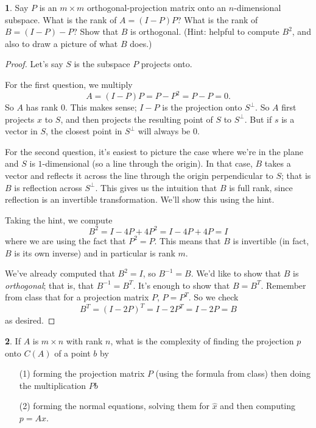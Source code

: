 \documentclass{article}
\theoremstyle{definition}
\newtheorem{prob}{}
\begin{document}
\begin{prob}
	Say $P$ is an $m \times m$ orthogonal-projection matrix onto an $n$-dimensional subspace. What is the rank of $A=(I-P)P$? What is the rank of $B=(I-P)-P$? Show that $B$ is orthogonal. (Hint: helpful to compute $B^2$, and also to draw a picture of what $B$ does.)
\end{prob}
\begin{proof}
	Let's say $S$ is the subspace $P$ projects onto.
	
	For the first question, we multiply 
	\[A=(I-P)P=P-P^2=P-P=0.\]
So $A$ has rank 0. This makes sense; $I-P$ is the projection onto $S^\perp$. So $A$ first projects $x$ to $S$, and then projects the resulting point of $S$ to $S^\perp$. But if $s$ is a vector in $S$, the closest point in $S^\perp$ will always be 0.
	
	For the second question, it's easiest to picture the case where we're in the plane and $S$ is $1$-dimensional (so a line through the origin). In that case, $B$ takes a vector and reflects it across the line through the origin perpendicular to $S$; that is $B$ is reflection across $S^\perp$. This gives us the intuition that $B$ is full rank, since reflection is an invertible transformation. We'll show this using the hint.
	
	Taking the hint, we compute 
	\[B^2=I -4P + 4P^2=I-4P+4P=I\]
	where we are using the fact that $P^2=P$. This means that $B$ is invertible (in fact, $B$ is its own inverse) and in particular is rank $m$.
	
	We've already computed that $B^2=I$, so $B^{-1}=B$. We'd like to show that $B$ is \emph{orthogonal}; that is, that $B^{-1}=B^T$. It's enough to show that $B=B^{T}$. Remember from class that for a projection matrix $P$, $P=P^T$. So we check
	\[B^T=(I-2P)^T=I-2P^T=I-2P=B\]
	as desired.
\end{proof}

\begin{prob}
	If $A$ is $m \times n$ with rank $n$, what is the complexity of finding the projection $p$ onto $C(A)$ of a point $b$ by 
	\begin{itemize}
		\item[(1)] forming the projection matrix $P$ (using the formula from class) then doing the multiplication $Pb$
		\item[(2)] forming the normal equations, solving them for $\hat{x}$ and then computing $p=A \hat{x}$.
	\end{itemize}
\end{prob}
\end{document}
